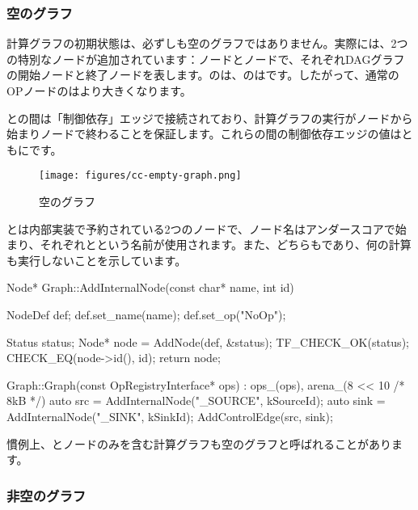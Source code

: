 \begin{content}
\subsubsection{空のグラフ}

計算グラフの初期状態は、必ずしも空のグラフではありません。実際には、2つの特別なノードが追加されています：ノードとノードで、それぞれDAGグラフの開始ノードと終了ノードを表します。のは、のはです。したがって、通常のOPノードのはより大きくなります。

との間は「制御依存」エッジで接続されており、計算グラフの実行がノードから始まりノードで終わることを保証します。これらの間の制御依存エッジの値はともにです。

\begin{figure}[H]
\centering
\texttt{[image: figures/cc-empty-graph.png]}
\caption{空のグラフ}
 \label{fig:cc-empty-graph}
\end{figure}

とは内部実装で予約されている2つのノードで、ノード名はアンダースコアで始まり、それぞれとという名前が使用されます。また、どちらもであり、何の計算も実行しないことを示しています。

\begin{leftbar}
\begin{c++}
Node* Graph::AddInternalNode(const char* name, int id) {
  NodeDef def;
  def.set_name(name);
  def.set_op("NoOp");

  Status status;
  Node* node = AddNode(def, &status);
  TF_CHECK_OK(status);
  CHECK_EQ(node->id(), id);
  return node;
}

Graph::Graph(const OpRegistryInterface* ops)
    : ops_(ops), arena_(8 << 10 /* 8kB */) {
  auto src  = AddInternalNode("_SOURCE", kSourceId);
  auto sink = AddInternalNode("_SINK",   kSinkId);
  AddControlEdge(src, sink);
}
\end{c++}
\end{leftbar}

慣例上、とノードのみを含む計算グラフも空のグラフと呼ばれることがあります。

\subsubsection{非空のグラフ}


\end{content}
